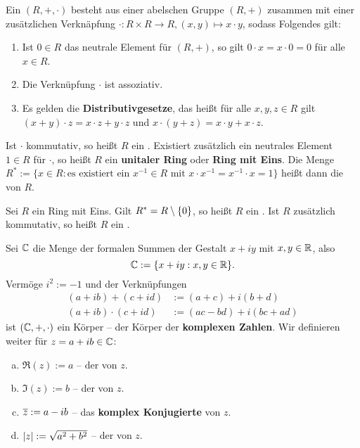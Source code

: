 \begin{definition}[Ring]
	\label{def:I.4.5}
	Ein  $(R,+,\cdot)$ besteht aus einer abelschen Gruppe $(R,+)$ zusammen mit einer zusätzlichen Verknäpfung $\cdot \colon R \times R \rightarrow R, (x,y) \mapsto x \cdot y$, sodass Folgendes gilt:
	\begin{enumerate}[(1)]
		\item Ist $0 \in R$ das neutrale Element für $(R,+)$, so gilt $0 \cdot x = x \cdot 0 = 0$ für alle $x \in R$.
		\item Die Verknüpfung $\cdot$ ist assoziativ.
		\item Es gelden die \textbf{Distributivgesetze}, das heißt für alle $x,y,z \in R$ gilt $(x+y) \cdot z = x\cdot z + y \cdot z$ und $x\cdot(y+z) = x \cdot y + x \cdot z$. 
	\end{enumerate}
	Ist $\cdot$ kommutativ, so heißt $R$ ein .
	Existiert zusätzlich ein neutrales Element $1 \in R$ für $\cdot$, so heißt $R$ ein \textbf{unitaler Ring} oder \textbf{Ring mit Eins}.
	Die Menge $R^* := \{x \in R : \text{es existiert ein } x^{-1} \in R \text{ mit } x \cdot x^{-1} = x^{-1} \cdot x = 1\}$ heißt dann die  von $R$.   
\end{definition}

\setcounter{definition}{6}
\begin{definition}
	\label{def:I.4.7}
	Sei $R$ ein Ring mit Eins.
	Gilt $R^* = R \setminus \{0\}$, so heißt $R$ ein .
	Ist $R$ zusätzlich kommutativ, so heißt $R$ ein .
\end{definition}

\setcounter{definition}{9}
\begin{definition}
	\label{def:I.4.10}
	Sei $\mathbb{C}$ die Menge der formalen Summen der Gestalt $x+iy$ mit $x,y \in \mathbb{R}$, also
	\[
		\mathbb{C}:= \{x+iy : x,y \in \mathbb{R}\}.
	\]
	\newpage
	Vermöge $i^2 := -1$ und der Verknüpfungen
	\begin{align*}
		(a+ib) + (c+id) &:= (a+c) + i(b+d) \\
		(a+ib) \cdot (c+id) &:= (ac-bd) + i(bc+ad)
	\end{align*}
	ist $(\mathbb{C},+,\cdot)$ ein Körper -- der Körper der \textbf{komplexen Zahlen}. 
	Wir definieren weiter für $z = a+ib \in \mathbb{C}$:
	\begin{enumerate}[a)]
		\item $\Re(z) := a$ -- der  von $z$.
		\item $\Im(z) := b$ -- der  von $z$.
		\item $\overline{z} := a-ib$ -- das \textbf{komplex Konjugierte} von $z$. 
		\item $\lvert z\rvert := \sqrt{a^2+b^2}$ -- der  von $z$.
	\end{enumerate}
\end{definition}

